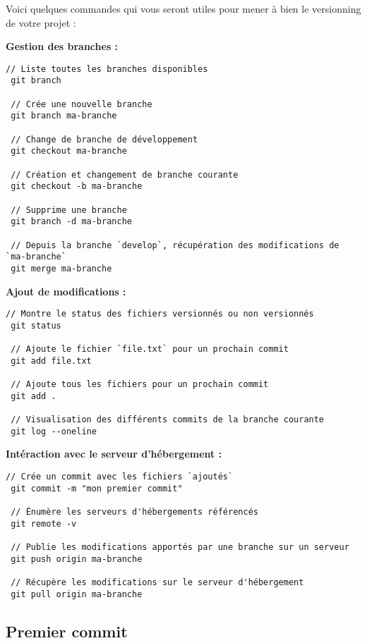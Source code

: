 \documentclass[11pt,a4paper,oneside]{article}
\begin{document}
\vspace{5mm}

Voici quelques commandes qui vous seront utiles pour mener à bien le versionning de votre projet :

\vspace{3mm}
\textbf{Gestion des branches :}
\begin{lstlisting}[style=custombash]
 // Liste toutes les branches disponibles
 git branch
 
 // Crée une nouvelle branche
 git branch ma-branche

 // Change de branche de développement
 git checkout ma-branche
	
 // Création et changement de branche courante
 git checkout -b ma-branche
 
 // Supprime une branche
 git branch -d ma-branche
 
 // Depuis la branche `develop`, récupération des modifications de `ma-branche`
 git merge ma-branche
\end{lstlisting}

\textbf{Ajout de modifications :}
\begin{lstlisting}[style=custombash]
 // Montre le status des fichiers versionnés ou non versionnés
 git status

 // Ajoute le fichier `file.txt` pour un prochain commit
 git add file.txt

 // Ajoute tous les fichiers pour un prochain commit
 git add .

 // Visualisation des différents commits de la branche courante
 git log --oneline
\end{lstlisting}
 
\textbf{Intéraction avec le serveur d'hébergement :}
\begin{lstlisting}[style=custombash]
 // Crée un commit avec les fichiers `ajoutés`
 git commit -m "mon premier commit"

 // Énumère les serveurs d'hébergements référencés
 git remote -v

 // Publie les modifications apportés par une branche sur un serveur
 git push origin ma-branche

 // Récupère les modifications sur le serveur d'hébergement
 git pull origin ma-branche
\end{lstlisting}

\subsection{Premier commit}
\end{document}
